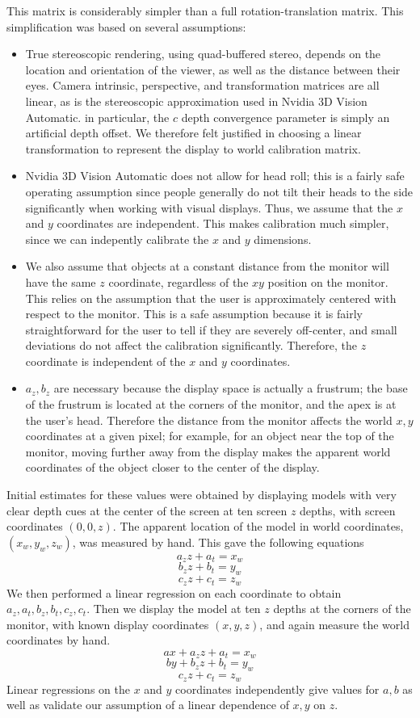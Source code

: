 \documentclass[pageno]{jpaper}
\begin{document}
This matrix is considerably simpler than a full rotation-translation matrix. This simplification was based on several assumptions:
\begin{itemize}
\item True stereoscopic rendering, using quad-buffered stereo, depends on the location and orientation of the viewer, as well as the distance between
their eyes.
Camera intrinsic, perspective, and transformation matrices are all linear, as is the stereoscopic approximation used in Nvidia 3D Vision
Automatic. in particular, the $c$ depth convergence parameter is simply an artificial depth offset. We therefore felt justified in choosing
a linear transformation to represent the display to world calibration matrix.
\item Nvidia 3D Vision Automatic does not allow for head roll; this is a fairly safe operating assumption since people generally do
not tilt their heads to the side significantly when working with visual displays. Thus, we assume that the $x$ and $y$ coordinates are
independent. This makes calibration much simpler, since we can indepently calibrate the $x$ and $y$ dimensions.
\item We also assume that objects at a constant distance from the monitor will have the same $z$ coordinate, regardless
of the $xy$ position on the monitor. This relies on the assumption that the user is approximately centered with respect to the monitor. This is
a safe assumption because it is fairly straightforward for the user to tell if they are severely off-center, and small deviations
do not affect the calibration significantly. Therefore, the $z$ coordinate is independent of the $x$ and $y$ coordinates.
\item $a_z, b_z$ are necessary because the display space is actually a frustrum; the base of the frustrum is located at the corners of
the monitor, and the apex is at the user's head. Therefore the distance from the monitor affects the world $x,y$ coordinates at a given
pixel; for example, for an object near the top of the monitor, moving further away from the display makes the apparent world coordinates of the
object closer to the center of the display.
\end{itemize}

Initial estimates for these values were obtained by displaying models with very clear depth cues at the center of the screen at ten screen $z$ depths,
with screen coordinates $(0,0,z)$. The apparent location of the model in world coordinates, $(x_w, y_w, z_w)$, was measured by hand. This gave the following equations
$$a_zz + a_t = x_w$$
$$b_zz + b_t = y_w$$
$$c_zz + c_t = z_w$$
We then performed a linear regression on each coordinate to obtain $a_z, a_t, b_z, b_t, c_z, c_t$.
Then we display the model at ten $z$ depths at the corners of the monitor, with known display coordinates $(x, y, z)$, and again measure the world coordinates
by hand.
$$ax + a_zz + a_t = x_w$$
$$by + b_zz + b_t = y_w$$
$$c_zz + c_t = z_w$$
Linear regressions on the $x$ and $y$ coordinates independently give values for $a,b$ as well as validate our assumption of a linear dependence of $x,y$ on $z$.
\end{document}
